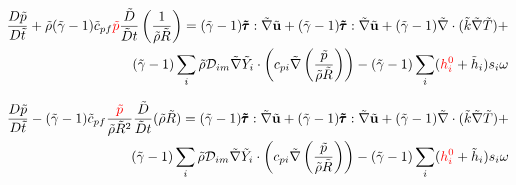 \documentclass[preprint,12pt,authoryear]{elsarticle}
\begin{document}
\begin{equation}
\begin{split}
        \frac{D \tilde{p}}{D\tilde{t}}
	+
        \tilde{\rho}
	(\tilde{\gamma}-1)
        \tilde{c}_{pf}
        {\color{red} \tilde{p} }
        \frac{\tilde{D}}{\tilde{D} t}
        \left(
                \frac{1}{\tilde{\rho}\tilde{R}}
        \right)
        =
	(\tilde{\gamma}-1)
        \pmb{\tilde{\tau}}:\tilde{\nabla} \tilde{\mathbf{u}} 
        + 
	(\tilde{\gamma}-1)
        \pmb{\tilde{\tau}}:\tilde{\nabla} \tilde{\mathbf{u}} 
	+
	(\tilde{\gamma}-1)
        \tilde{\nabla} \cdot (\tilde{k}\tilde{\nabla} \tilde{T})
        +
	\\
	(\tilde{\gamma}-1)
        \sum\limits_i 
        \tilde{\rho}
        \mathcal{D}_{im}
        \tilde{\nabla}
        \tilde{Y}_i     
        \cdot
        \left(
                c_{pi}
                \tilde{\nabla}
                \left(
                	\frac{\tilde{p}}{\tilde{\rho}\tilde{R}}
                \right)
        \right)
	-
	(\tilde{\gamma}-1)
        \sum\limits_i
        ({\color{red} h_i^0} + \tilde{h}_i)
        s_i	
        \omega
\end{split}
\end{equation}

\begin{equation}
\begin{split}
        \frac{D \tilde{p}}{D\tilde{t}}
	-
	(\tilde{\gamma}-1)
        \tilde{c}_{pf}
	\frac{ {\color{red} \tilde{p} } }{\tilde{\rho}\tilde{R}^2}
        \frac{\tilde{D}}{\tilde{D} t}
	(
	\tilde{\rho}\tilde{R}
	)
        =
	(\tilde{\gamma}-1)
        \pmb{\tilde{\tau}}:\tilde{\nabla} \tilde{\mathbf{u}} 
        + 
	(\tilde{\gamma}-1)
        \pmb{\tilde{\tau}}:\tilde{\nabla} \tilde{\mathbf{u}} 
        + 
	(\tilde{\gamma}-1)
        \tilde{\nabla} \cdot (\tilde{k}\tilde{\nabla} \tilde{T})
        +
	\\
	(\tilde{\gamma}-1)
        \sum\limits_i 
        \tilde{\rho}
        \mathcal{D}_{im}
        \tilde{\nabla}
        \tilde{Y}_i     
        \cdot
        \left(
                c_{pi}
                \tilde{\nabla}
                \left(
                	\frac{\tilde{p}}{\tilde{\rho}\tilde{R}}
                \right)
        \right)
	-
	(\tilde{\gamma}-1)
        \sum\limits_i
        ({\color{red} h_i^0} + \tilde{h}_i)
        s_i	
        \omega
\end{split}
\end{equation}
\end{document}
